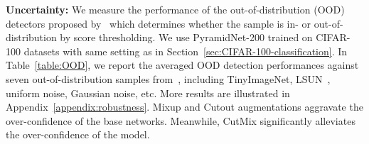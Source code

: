

\noindent\textbf{Uncertainty: }
We measure the performance of the out-of-distribution (OOD) detectors proposed by~\cite{hendrycks2016baseline} which determines whether the sample is in- or out-of-distribution by score thresholding.
We use PyramidNet-200 trained on CIFAR-100 datasets with same setting as in Section~\ref{sec:CIFAR-100-classification}.
In Table~\ref{table:OOD}, we report the averaged OOD detection performances against seven out-of-distribution samples from~\cite{hendrycks2016baseline, liang2017odin}, including TinyImageNet, LSUN~\cite{yu2015lsun}, uniform noise, Gaussian noise, etc. More results are illustrated in Appendix~\ref{appendix:robustness}.
Mixup and Cutout augmentations aggravate the over-confidence of the base networks. Meanwhile, CutMix significantly alleviates the over-confidence of the model.

